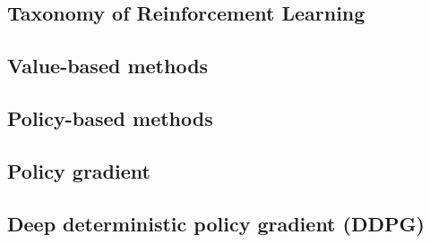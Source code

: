 \subsection{Taxonomy of Reinforcement Learning}

\subsection{Value-based methods}

\subsection{Policy-based methods}

\subsection{Policy gradient}

\subsection{Deep deterministic policy gradient (DDPG)}
